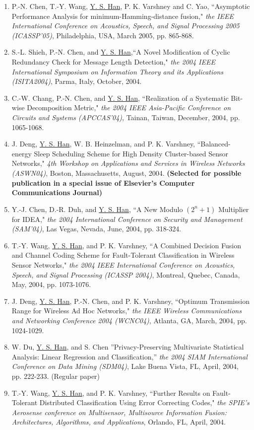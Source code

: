 \begin{llist}
\begin{itemize}
\begin{enumerate}
\item P.-N. Chen, T.-Y. Wang, \underline{Y.  S. Han}, P. K.
Varshney and C. Yao, ``Asymptotic Performance Analysis for
minimum-Hamming-distance fusion," {\it the IEEE International
Conference on Acoustics, Speech, and Signal Processing 2005
(ICASSP'05)}, Philadelphia, USA, March 2005, pp. 865-868.

\item S.-L. Shieh, P.-N. Chen, and \underline{Y. S. Han},``A Novel
Modification of Cyclic Redundancy Check for Message Length
Detection," {\it the 2004 IEEE International Symposium on
Information Theory and its Applications (ISITA2004)}, Parma,
Italy, October, 2004.

\item C.-W. Chang, P.-N. Chen, and \underline{Y. S. Han},
``Realization of a Systematic Bit-wise Decomposition Metric," {\it
the 2004 IEEE Asia-Pacific Conference on Circuits and Systems
(APCCAS'04)}, Tainan, Taiwan, December, 2004, pp. 1065-1068.

\item J. Deng, \underline{Y. S. Han}, W. B. Heinzelman, and P. K.
Varshney, ``Balanced-energy Sleep Scheduling Scheme for High
Density Cluster-based Sensor Networks," {\it 4th Workshop on
Applications and Services in Wireless Networks (ASWN04)}, Boston,
Massachusetts, August, 2004. {\bf(Selected for possible
publication in a special issue of Elsevier's Computer
Communications Journal)}

\item Y.-J. Chen, D.-R. Duh, and \underline{Y. S. Han}, ``A New
Modulo $(2^n+1)$ Multiplier for IDEA," {\it the 2004 International
Conference on Security and Management (SAM'04)}, Las Vegas,
Nevada, June, 2004, pp. 318-324.


\item  T.-Y. Wang, \underline{Y. S. Han}, and P. K. Varshney, ``A
Combined Decision Fusion and Channel Coding Scheme for
Fault-Tolerant Classification in Wireless Sensor Networks," {\it
the 2004 IEEE International Conference on Acoustics, Speech, and
Signal Processing (ICASSP 2004)}, Montreal, Quebec, Canada, May,
2004, pp. 1073-1076.

\item J. Deng, \underline{Y. S. Han}, P.-N. Chen, and P. K.
Varshney, ``Optimum Transmission Range for Wireless Ad Hoc
Networks," {\it the IEEE Wireless Communications and Networking
Conference 2004 (WCNC04)},  Atlanta, GA, March, 2004, pp.
1024-1029.

\item W. Du, \underline{Y. S. Han}, and S. Chen
''Privacy-Preserving Multivariate Statistical Analysis: Linear
Regression and Classification,'' {\it the 2004 SIAM International
Conference on Data Mining (SDM04)}, Lake Buena Vista, FL, April,
2004, pp. 222-233. (Regular paper)
 \item T.-Y. Wang, \underline{Y. S.
Han}, and P. K. Varshney, ``Further Results on Fault-Tolerant
Distributed Classification Using Error Correcting Codes," {\it the
SPIE's Aerosense conference on Multisensor, Multisource
Information Fusion: Architectures, Algorithms, and Applications},
Orlando, FL, April, 2004.


\end{enumerate}
\end{itemize}
\end{llist}
